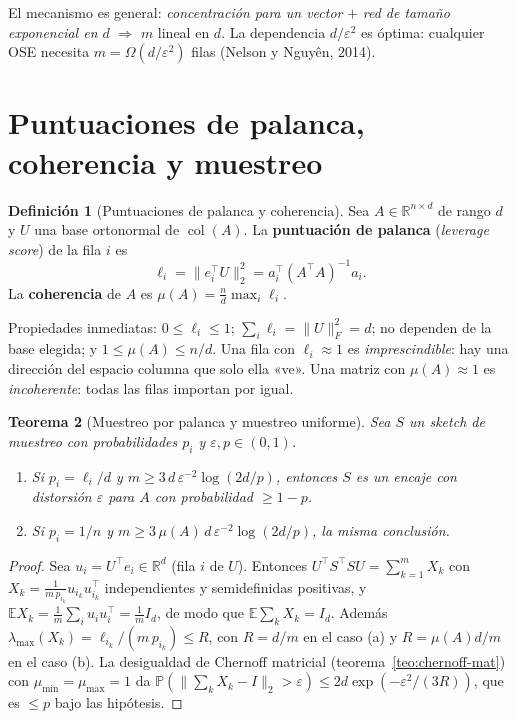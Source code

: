 \documentclass[11pt,a4paper,oneside]{book}
\newtheorem{teorema}{Teorema}[chapter]
\theoremstyle{definition}
\newtheorem{definicion}[teorema]{Definición}
\theoremstyle{remark}
\newcommand{\R}{\mathbb{R}}
\newcommand{\E}{\mathbb{E}}
\newcommand{\Prob}{\mathbb{P}}
\newcommand{\T}{^{\top}}
\newcommand{\eps}{\varepsilon}
\newcommand{\nrm}[1]{\lVert #1\rVert}
\DeclareMathOperator{\col}{col}
\begin{document}
El mecanismo es general: \emph{concentración para un vector} $+$ \emph{red de tamaño exponencial en $d$}
$\Rightarrow$ $m$ lineal en $d$. La dependencia $d/\eps^2$ es óptima: cualquier OSE necesita
$m=\Omega(d/\eps^2)$ filas (Nelson y Nguyên, 2014).

\section{Puntuaciones de palanca, coherencia y muestreo}

\begin{definicion}[Puntuaciones de palanca y coherencia]\label{def:palanca}
Sea $A\in\R^{n\times d}$ de rango $d$ y $U$ una base ortonormal de $\col(A)$. La \textbf{puntuación de palanca}
(\emph{leverage score}) de la fila $i$ es
\[ \ell_i=\nrm{e_i\T U}_2^2=a_i\T(A\T A)^{-1}a_i . \]
La \textbf{coherencia} de $A$ es $\mu(A)=\frac nd\max_i\ell_i$.
\end{definicion}

Propiedades inmediatas: $0\le\ell_i\le1$; $\sum_i\ell_i=\nrm{U}_F^2=d$; no dependen de la base elegida; y
$1\le\mu(A)\le n/d$. Una fila con $\ell_i\approx1$ es \emph{imprescindible}: hay una dirección del espacio columna
que solo ella «ve». Una matriz con $\mu(A)\approx1$ es \emph{incoherente}: todas las filas importan por igual.

\begin{teorema}[Muestreo por palanca y muestreo uniforme]\label{teo:muestreo}
Sea $S$ un \emph{sketch} de muestreo con probabilidades $p_i$ y $\eps,p\in(0,1)$.
\begin{enumerate}[label=(\alph*)]
  \item Si $p_i=\ell_i/d$ y $m\ge3\,d\,\eps^{-2}\log(2d/p)$, entonces $S$ es un encaje con distorsión $\eps$ para $A$ con probabilidad $\ge1-p$.
  \item Si $p_i=1/n$ y $m\ge3\,\mu(A)\,d\,\eps^{-2}\log(2d/p)$, la misma conclusión.
\end{enumerate}
\end{teorema}

\begin{proof}
Sea $u_i=U\T e_i\in\R^d$ (fila $i$ de $U$). Entonces $U\T S\T SU=\sum_{k=1}^mX_k$ con
$X_k=\frac{1}{m\,p_{i_k}}u_{i_k}u_{i_k}\T$ independientes y semidefinidas positivas, y
$\E X_k=\frac1m\sum_iu_iu_i\T=\frac1mI_d$, de modo que $\E\sum_kX_k=I_d$. Además
$\lambda_{\max}(X_k)=\ell_{i_k}/(m\,p_{i_k})\le R$, con $R=d/m$ en el caso (a) y $R=\mu(A)d/m$ en el caso (b). La
desigualdad de Chernoff matricial (teorema~\ref{teo:chernoff-mat}) con $\mu_{\min}=\mu_{\max}=1$ da
$\Prob(\nrm{\sum_kX_k-I}_2>\eps)\le2d\exp(-\eps^2/(3R))$, que es $\le p$ bajo las hipótesis.
\end{proof}
\end{document}
